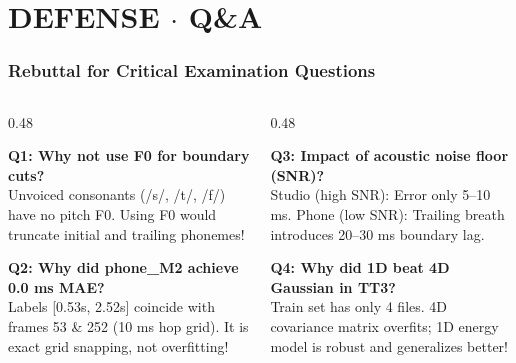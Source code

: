 \documentclass[aspectratio=169, 10pt]{beamer}
\begin{document}
\section{DEFENSE $\cdot$ Q\&A}
\begin{frame}
  \frametitle{Rebuttal for Critical Examination Questions}
  \begin{tcolorbox}[contentframe]
  \begin{columns}[T]
    \begin{column}{0.48\textwidth}
      \begin{tcolorbox}[darkcard, height=1.90cm, valign=top]
        {\fontsize{8pt}{9pt}\selectfont\color{cyanGlow}\textbf{Q1: Why not use F0 for boundary cuts?}}\\[2pt]
        {\fontsize{7.5pt}{8.5pt}\selectfont
        Unvoiced consonants (/s/, /t/, /f/) have no pitch F0. Using F0 would truncate initial and trailing phonemes!}
      \end{tcolorbox}
      \vskip0.15cm
      \begin{tcolorbox}[darkcard, height=1.90cm, valign=top]
        {\fontsize{8pt}{9pt}\selectfont\color{cyanGlow}\textbf{Q2: Why did phone\_M2 achieve 0.0 ms MAE?}}\\[2pt]
        {\fontsize{7.5pt}{8.5pt}\selectfont
        Labels [0.53s, 2.52s] coincide with frames 53 \& 252 (10 ms hop grid). It is exact grid snapping, not overfitting!}
      \end{tcolorbox}
    \end{column}

    \begin{column}{0.48\textwidth}
      \begin{tcolorbox}[darkcard, height=1.90cm, valign=top]
        {\fontsize{8pt}{9pt}\selectfont\color{cyanGlow}\textbf{Q3: Impact of acoustic noise floor (SNR)?}}\\[2pt]
        {\fontsize{7.5pt}{8.5pt}\selectfont
        Studio (high SNR): Error only 5--10 ms. Phone (low SNR): Trailing breath introduces 20--30 ms boundary lag.}
      \end{tcolorbox}
      \vskip0.15cm
      \begin{tcolorbox}[darkcard, height=1.90cm, valign=top]
        {\fontsize{8pt}{9pt}\selectfont\color{cyanGlow}\textbf{Q4: Why did 1D beat 4D Gaussian in TT3?}}\\[2pt]
        {\fontsize{7.5pt}{8.5pt}\selectfont
        Train set has only 4 files. 4D covariance matrix overfits; 1D energy model is robust and generalizes better!}
      \end{tcolorbox}
    \end{column}
  \end{columns}
  \end{tcolorbox}
\end{frame}
\end{document}
